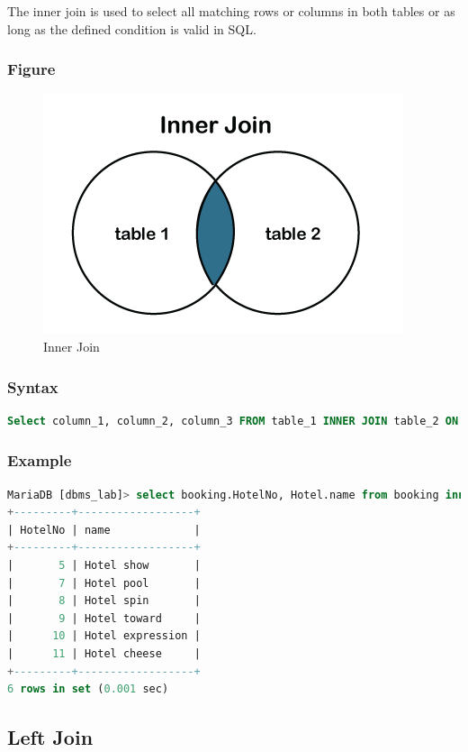 \documentclass[11pt]{article}
\begin{document}
The inner join is used to select all matching rows or columns in both tables or as long as the defined condition is valid in SQL.

\subsubsection*{Figure}

\begin{figure}[H]
	\centering
	\includegraphics[width=.45\textwidth]{inner join.png}
	\caption{ Inner Join}
\end{figure}

\subsubsection*{Syntax}

\begin{lstlisting}[language=sql]
Select column_1, column_2, column_3 FROM table_1 INNER JOIN table_2 ON table_1.column = table_2.column; 
\end{lstlisting}

\subsubsection*{Example}

\begin{lstlisting}[language=sql]
MariaDB [dbms_lab]> select booking.HotelNo, Hotel.name from booking inner join Hotel on booking.HotelNo = Hotel.HotelNo;
+---------+------------------+
| HotelNo | name             |
+---------+------------------+
|       5 | Hotel show       |
|       7 | Hotel pool       |
|       8 | Hotel spin       |
|       9 | Hotel toward     |
|      10 | Hotel expression |
|      11 | Hotel cheese     |
+---------+------------------+
6 rows in set (0.001 sec)
\end{lstlisting}

\subsection{Left Join}
\end{document}

